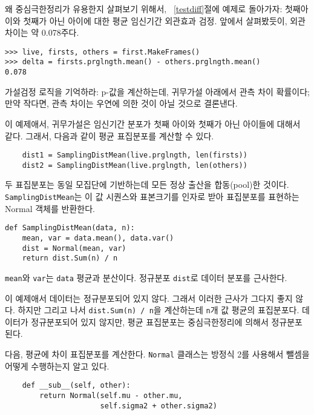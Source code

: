 왜 중심극한정리가 유용한지 살펴보기 위해서, ~\ref{testdiff}절에 예제로 돌아가자: 첫째아이와 첫째가 아닌 아이에 대한 평균 임신기간 외관효과 검정.
앞에서 살펴봤듯이, 외관 차이는 약 0.078주다.

\begin{verbatim}
>>> live, firsts, others = first.MakeFrames()
>>> delta = firsts.prglngth.mean() - others.prglngth.mean()
0.078
\end{verbatim}

가설검정 로직을 기억하라: p-값을 계산하는데, 귀무가설 아래에서 관측 차이 확률이다; 만약 작다면, 관측 차이는 우연에 의한 것이 아닐 것으로 결론낸다.

이 예제애서, 귀무가설은 임신기간 분포가 첫째 아이와 첫째가 아닌 아이들에 대해서 같다. 그래서, 다음과 같이 평균 표집분포를 계산할 수 있다.

\begin{verbatim}
    dist1 = SamplingDistMean(live.prglngth, len(firsts))
    dist2 = SamplingDistMean(live.prglngth, len(others))
\end{verbatim}

두 표집분포는 동일 모집단에 기반하는데 모든 정상 출산을 합동(pool)한 것이다. {\tt SamplingDistMean}는 이 값 시퀀스와 표본크기를 인자로 받아 표집분포를 표현하는 Normal 객체를 반환한다.

\begin{verbatim}
def SamplingDistMean(data, n):
    mean, var = data.mean(), data.var()
    dist = Normal(mean, var)
    return dist.Sum(n) / n
\end{verbatim}

{\tt mean}와 {\tt var}는 {\tt data} 평균과 분산이다.
정규분포 {\tt dist}로 데이터 분포를 근사한다.

이 예제애서 데이터는 정규분포되어 있지 않다. 그래서 이러한 근사가 그다지 좋지 않다. 하지만 그리고 나서 {\tt dist.Sum(n) / n}을 계산하는데 {\tt n}개 값 평균의 표집분포다. 데이터가 정규분포되어 있지 않지만, 평균 표집분포는 중심극한정리에 의해서 정규분포된다.

다음, 평균에 차이 표집분포를 계산한다.
{\tt Normal} 클래스는 방정식 2를 사용해서 뺄셈을 어떻게 수행하는지 알고 있다.

\begin{verbatim}
    def __sub__(self, other):
        return Normal(self.mu - other.mu,
                      self.sigma2 + other.sigma2)
\end{verbatim}

